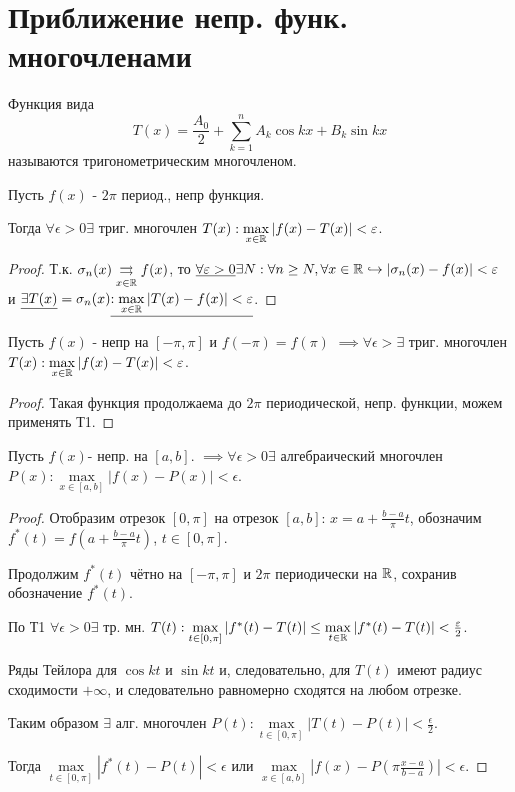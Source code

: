 \documentclass{article}
\begin{document}
\section{Приближение непр. функ. многочленами}
\begin{definition}
  Функция вида
  \[
    T(x)=\frac{A_0}{2}+\sum_{k=1}^{n}A_k\cos kx + B_k \sin kx
  \]
  называются тригонометрическим многочленом.
\end{definition}
\begin{theorem}[Т1 Веерштрасса]
  Пусть $f(x)$ - $2\pi$ период., непр функция.

  Тогда $\forall \epsilon>0 \exists$ триг. многочлен $T(x): \max \limits_{x\in \mathbb{R}} |f(x)-T(x)| < \varepsilon$.
\end{theorem}
\begin{proof}
  Т.к. $\sigma_n(x)\underset{x\in \mathbb{R}}{\rightrightarrows} f(x)$,
  то $\underline{\forall \varepsilon >0} \exists N : \forall n\ge N, \forall x\in \mathbb{R} \hookrightarrow |\sigma_n(x)-f(x)|<\varepsilon$
  и $\underline{\exists T(x)}=\sigma_n(x)\underline{:\max\limits_{x\in \mathbb{R}} |T(x)-f(x)|<\varepsilon}$.
\end{proof}
\begin{theorem}[Т1' (перефразирование)]
  Пусть $f(x)$ - непр на $[-\pi,\pi]$ и $f(-\pi)=f(\pi)$
  $\implies \forall \epsilon > \exists$ триг. многочлен $T(x): \max \limits_{x\in \mathbb{R}} |f(x)-T(x)| < \varepsilon$.
\end{theorem}
\begin{proof}
  Такая функция продолжаема до $2\pi$ периодической, непр. функции, можем применять Т1.
\end{proof}
\begin{theorem}[Т2 Веерштрасса]
  Пусть $f(x)$- непр. на $[a,b]$.
  $\implies \forall \epsilon>0 \exists$ алгебраический многочлен
  $P(x):\max \limits_{x\in[a,b]}|f(x)-P(x)|<\epsilon$.
\end{theorem}
\begin{proof}
  Отобразим отрезок $[0,\pi]$ на отрезок $[a,b]$:
  $x=a+\frac{b-a}{\pi}t$, обозначим $f^{*}(t)=f(a+\frac{b-a}{\pi}t)$, $t\in[0,\pi]$.

  Продолжим $f^{*}(t)$ чётно на $[-\pi,\pi]$ и $2\pi$ периодически на $\mathbb{R}$,
  сохранив обозначение $f^{*}(t)$.

  По Т1 $\forall \epsilon>0 \exists$ тр. мн.
  $T(t): \max \limits_{t\in[0,\pi]}|f^{*}(t)-T(t)| \le \max \limits_{t\in \mathbb{R}}|f^{*}(t)-T(t)| < \frac{\varepsilon}{2}$.

  Ряды Тейлора для $\cos kt$ и $\sin kt$ и, следовательно, для $T(t)$
  имеют радиус сходимости $+\infty$, и следовательно равномерно сходятся на любом отрезке.
  
  Таким образом $\exists$ алг. многочлен $P(t):\max\limits_{t\in[0,\pi]} |T(t)-P(t)|<\frac{\epsilon}{2}$.

  Тогда $\max \limits_{t\in[0,\pi]}|f^{*}(t)-P(t)|< \epsilon$ или 
  $\max \limits_{x\in[a,b]} |f(x)-P(\pi\frac{x-a}{b-a})|<\epsilon$.
\end{proof}
\end{document}
